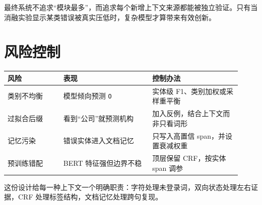 \documentclass[UTF8,10pt,a4paper,fontset=none]{ctexart}
\begin{document}
最终系统不追求“模块最多”，而追求每个新增上下文来源都能被独立验证。只有当消融实验显示某类错误被真实压低时，复杂模型才算带来有效创新。

\section{风险控制}
\small
\begin{tabular}{@{}p{0.22\linewidth}p{0.35\linewidth}p{0.35\linewidth}@{}}
\toprule
风险 & 表现 & 控制办法 \\
\midrule
类别不均衡 & 模型倾向预测 \texttt{O} & 实体级 F1、类别加权或采样重平衡 \\
过拟合后缀 & 看到“公司”就预测机构 & 加入反例，结合上下文而非只看词形 \\
记忆污染 & 错误实体进入文档记忆 & 只写入高置信 span，并设置衰减权重 \\
预训练错配 & BERT 特征强但边界不稳 & 顶层保留 CRF，按实体 span 调参 \\
\bottomrule
\end{tabular}
\normalsize

这份设计给每一种上下文一个明确职责：字符处理未登录词，双向状态处理左右证据，CRF 处理标签结构，文档记忆处理跨句复现。
\end{document}

